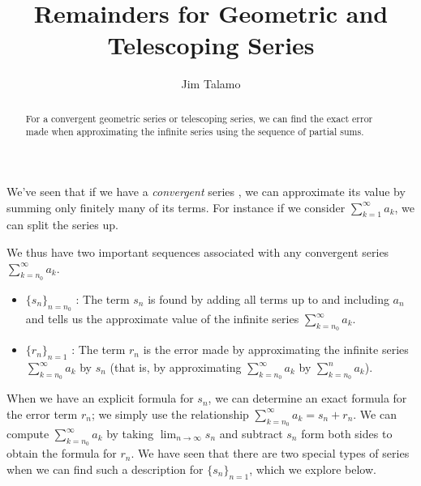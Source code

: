 \documentclass{ximera}
\author{Jim Talamo}
\title[Dig-In:]{Remainders for Geometric and Telescoping Series}
\begin{document}
\begin{abstract}
For a convergent geometric series or telescoping series, we can find the exact error made when approximating the infinite series using the sequence of partial sums.
\end{abstract}
\maketitle

We've seen that if we have a \emph{convergent} series , we can approximate its value by summing only finitely many of its terms.  For instance if we consider $\sum_{k=1}^{\infty} a_k$, we can split the series up.

\begin{image}
  \end{image}

We thus have two important sequences associated with any convergent series $\sum_{k=n_0}^{\infty} a_k$.

\begin{itemize}
\item $\{s_n\}_{n=n_0}$ : The term $s_n$ is found by adding all terms up to and including $a_n$ and tells us the approximate value of the infinite series $\sum_{k=n_0}^{\infty} a_k$.
 \item $\{r_n\}_{n=1}$ : The term $r_n$ is the error made by approximating the infinite series $\sum_{k=n_0}^{\infty} a_k$ by $s_n$ (that is, by approximating $\sum_{k=n_0}^{\infty} a_k$ by $\sum_{k=n_0}^n a_k$).
\end{itemize}

When we have an explicit formula for $s_n$, we can determine an exact formula for the error term $r_n$; we simply use the relationship $\sum_{k=n_0}^{\infty} a_k =   s_n +r_n$.  We can compute $\sum_{k=n_0}^{\infty} a_k$ by taking $\lim_{n \to \infty} s_n$ and subtract $s_n$ form both sides to obtain the formula for $r_n$.  We have seen that there are two special types of series when we can find such a description for $\{s_n\}_{n=1}$, which we explore below.
\end{document}
